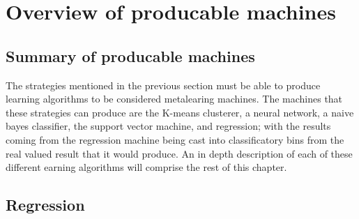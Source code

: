 \usepackage{amssymb}
\chapter{Overview of producable machines}
\label{Chapter3}

\newcommand{\keyword}[1]{\textbf{#1}}
\newcommand{\tabhead}[1]{\textbf{#1}}
\newcommand{\code}[1]{\texttt{#1}}
\newcommand{\file}[1]{\texttt{\bfseries#1}}
\newcommand{\option}[1]{\texttt{\itshape#1}}

\section{Summary of producable machines}
The strategies mentioned in the previous section must be able to produce learning algorithms
to be considered metalearing machines. The machines that these strategies can produce are
the K-means clusterer, a neural network, a naive bayes classifier, the support vector machine,
and regression; with the results coming from the regression machine being cast into classificatory bins
from the real valued result that it would produce. An in depth description of each of these different
earning algorithms will comprise the rest of this chapter.
\section{Regression}
